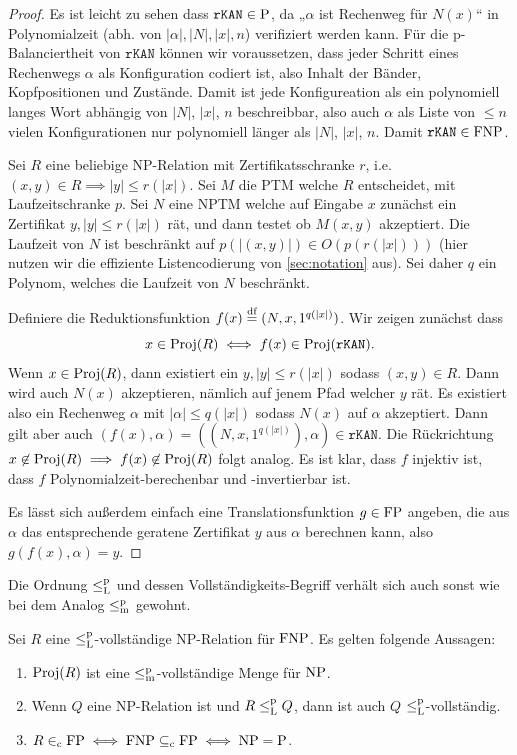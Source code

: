 \begin{proof}
    Es ist leicht zu sehen dass $\mathtt{rKAN}\in\P$, da „$\alpha$ ist Rechenweg für $N(x)$“ in Polynomialzeit (abh. von $|\alpha|, |N|, |x|, n$) verifiziert werden kann. Für die p-Balanciertheit von $\mathtt{rKAN}$ können wir voraussetzen, dass jeder Schritt eines Rechenwegs $\alpha$ als Konfiguration codiert ist, also Inhalt der Bänder, Kopfpositionen und Zustände. Damit ist jede Konfigureation als ein polynomiell langes Wort abhängig von $|N|$, $|x|$, $n$ beschreibbar, also auch $\alpha$ als Liste von $\leq n$ vielen Konfigurationen nur polynomiell länger als $|N|$, $|x|$, $n$.
    Damit $\mathtt{rKAN}\in\FNP$.

    Sei $R$ eine beliebige NP-Relation mit Zertifikatsschranke $r$, i.e. $(x,y)\in R\implies |y|\leq r(|x|)$. Sei $M$ die PTM welche $R$ entscheidet, mit Laufzeitschranke $p$. Sei $N$ eine NPTM welche auf Eingabe $x$ zunächst ein Zertifikat $y, |y|\leq r(|x|)$ rät, und dann testet ob $M(x,y)$ akzeptiert. Die Laufzeit von $N$ ist beschränkt auf $p(|(x,y)|)\in O(p(r(|x|)))$ (hier nutzen wir die effiziente Listencodierung von \ref{sec:notation} aus). Sei daher $q$ ein Polynom, welches die Laufzeit von $N$ beschränkt.

    Definiere die Reduktionsfunktion $f(x)\defeq(N, x, 1^{q(|x|)})$. Wir zeigen zunächst dass
    \[ x\in \Proj(R)\iff f(x)\in \Proj(\mathtt{rKAN}). \]
    Wenn $x\in\Proj(R)$, dann existiert ein $y, |y|\leq r(|x|)$ sodass $(x,y)\in R$. Dann wird auch $N(x)$ akzeptieren, nämlich auf jenem Pfad welcher $y$ rät. Es existiert also ein Rechenweg $\alpha$ mit $|\alpha|\leq q(|x|)$ sodass $N(x)$ auf $\alpha$ akzeptiert. Dann gilt aber auch $(f(x), \alpha)=((N,x,1^{q(|x|)}),\alpha)\in \mathtt{rKAN}$.
    Die Rückrichtung $x\not\in \Proj(R)\implies f(x)\not\in\Proj(R)$ folgt analog.
    Es ist klar, dass $f$ injektiv ist, dass $f$ Polynomialzeit-berechenbar und -invertierbar ist. 

    Es lässt sich außerdem einfach eine Translationsfunktion $g\in \FP$ angeben, die  aus $\alpha$ das entsprechende geratene Zertifikat $y$ aus $\alpha$ berechnen kann, also $g(f(x), \alpha)=y$.
\end{proof}

Die Ordnung $\leqlp$ und dessen Vollständigkeits-Begriff verhält sich auch sonst wie bei dem Analog $\leqmp$ gewohnt.
\begin{lemma}\label{lemma:fnp-completeness}
    Sei $R$ eine $\leqlp$-vollständige NP-Relation für $\FNP$. Es gelten folgende Aussagen:
    \begin{enumerate}
        \item $\Proj(R)$ ist eine $\leqmp$-vollständige Menge für $\NP$.
        \item Wenn $Q$ eine NP-Relation ist und $R\leqlp Q$, dann ist auch $Q$ $\leqlp$-vollständig.
        \item $R\inc \FP \iff \FNP \subseteqc \FP \iff \NP=\P$.
    \end{enumerate}
\end{lemma}

